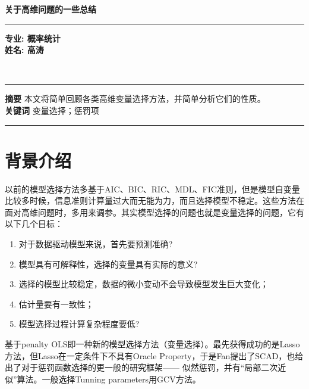 ﻿\documentclass[hyperref,12pt]{ctexart}
\begin{document}
\thispagestyle{empty}
\begin{titlepage}
  {\LARGE \raggedleft \textbf{关于高维问题的一些总结}}\\
  \rule{\linewidth}{1.5mm}
  \vskip 0.1in
  \begin{flushright}
  \textbf{专业: 概率统计}\\
  \textbf{姓名: 高涛}\\
  \end{flushright}

 \vspace*{\fill}

  {\Large
  }
\end{titlepage}
\clearpage


\begin{center}
\\
\vskip 0.15in
\end{center}
\hrule
\vskip 0.1in
\textbf{摘要}\hspace*{1em}
本文将简单回顾各类高维变量选择方法，并简单分析它们的性质。\\
\textbf{关键词}\hspace*{1em} 变量选择；惩罚项
\vskip 0.1in
\hrule

\section{背景介绍}
以前的模型选择方法多基于AIC、BIC、RIC、MDL、FIC准则，但是模型自变量比较多时候，信息准则计算量过大而无能为力，而且选择模型不稳定。这些方法在面对高维问题时，多用来调参。其实模型选择的问题也就是变量选择的问题，它有以下几个目标：
\begin{enumerate}[(1)]
	\item 对于数据驱动模型来说，首先要预测准确?
	\item 模型具有可解释性，选择的变量具有实际的意义?
	\item 选择的模型比较稳定，数据的微小变动不会导致模型发生巨大变化；
	\item 估计量要有一致性；
	\item 模型选择过程计算复杂程度要低?
\end{enumerate}

基于penalty OLS即一种新的模型选择方法（变量选择）。最先获得成功的是Lasso方法，但Lasso在一定条件下不具有Oracle Property，于是Fan提出了SCAD，也给出了对于惩罚函数选择的更一般的研究框架—— 似然惩罚，并有“局部二次近似”算法。一般选择Tunning parameters用GCV方法。
\end{document}
